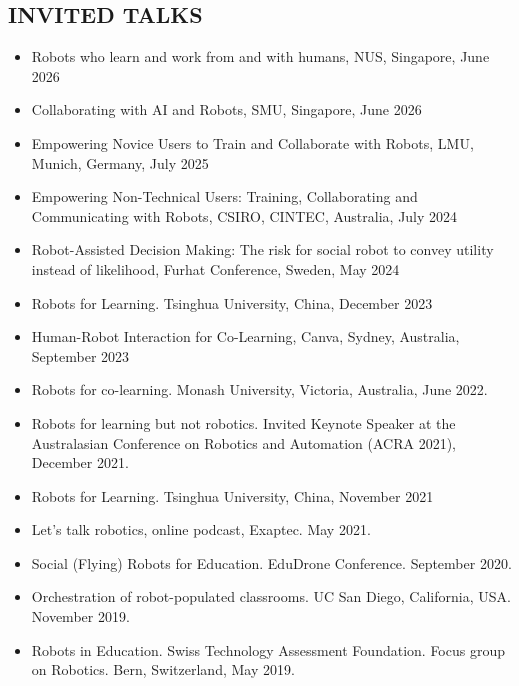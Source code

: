 
\subsection{INVITED TALKS}
\vspace{2pt}

\begin{itemize}
\item Robots who learn and work from and with humans, NUS, Singapore, June 2026
\item Collaborating with AI and Robots, SMU, Singapore, June 2026
    \item Empowering Novice Users to Train and Collaborate with Robots, LMU, Munich, Germany, July 2025
    \item Empowering Non-Technical Users: Training, Collaborating and Communicating with Robots, CSIRO, CINTEC, Australia, July 2024
    \item Robot-Assisted Decision Making: The risk for social robot to convey utility instead of likelihood, Furhat Conference, Sweden, May 2024
    \item Robots for Learning. Tsinghua University, China, December 2023
    \item Human-Robot Interaction for Co-Learning, Canva, Sydney, Australia, September 2023
    \item Robots for co-learning. Monash University, Victoria, Australia, June 2022.
    \item Robots for learning but not robotics. Invited Keynote Speaker at the Australasian Conference on Robotics and Automation (ACRA 2021), December 2021.
    \item Robots for Learning. Tsinghua University, China, November 2021
    \item Let's talk robotics, online podcast, Exaptec. May 2021.
    \item Social (Flying) Robots for Education. EduDrone Conference. September 2020.
    \item Orchestration of robot-populated classrooms. UC San Diego, California, USA. November 2019.
    \item Robots in Education. Swiss Technology Assessment Foundation. Focus group on Robotics. Bern, Switzerland, May 2019.

\end{itemize}
